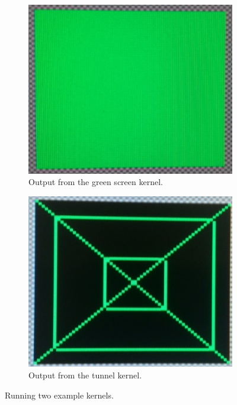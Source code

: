 \documentclass[../main/report.tex]{subfiles}
\begin{document}
\begin{figure}[H]
	\centering
	\begin{subfigure}[t]{0.45\textwidth}
		\centering
		\includegraphics[width=\textwidth]{../results/diagrams/green_screen_run.jpg}
		\caption{Output from the green screen kernel.}
	\end{subfigure} 
	\begin{subfigure}[t]{0.45\textwidth}
		\centering
		\includegraphics[width=\textwidth]{../results/diagrams/kernel_run_tunnel.jpg}	
		\caption{Output from the tunnel kernel.}
	\end{subfigure}
	\caption{Running two example kernels.}
	\label{fig:kernel_outputs}

\end{figure}
\end{document}
